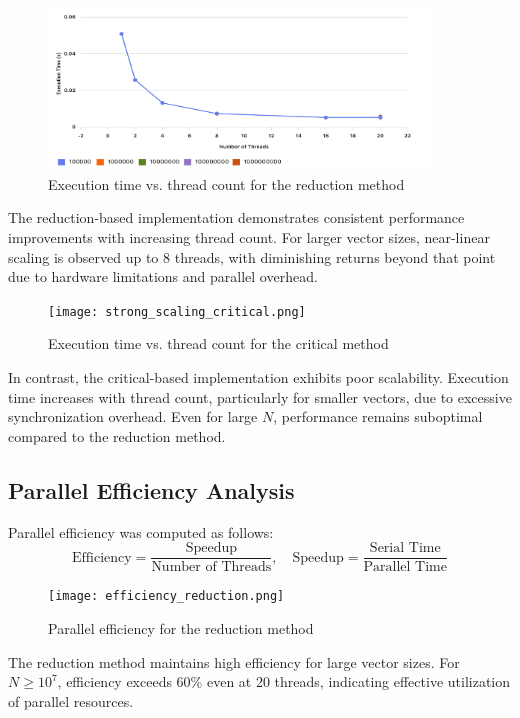 \documentclass[unicode,11pt,a4paper,oneside,numbers=endperiod,openany]{scrartcl}
\begin{document}
\begin{figure}[h]
  \centering
  \includegraphics[width=0.9\textwidth]{figures/Figure 1: Strong Scaling - Reduction Method.png}
  \caption{Execution time vs. thread count for the reduction method}
\end{figure}

The reduction-based implementation demonstrates consistent performance improvements with increasing thread count. For larger vector sizes, near-linear scaling is observed up to 8 threads, with diminishing returns beyond that point due to hardware limitations and parallel overhead.

\begin{figure}[h]
  \centering
  \texttt{[image: strong\_scaling\_critical.png]}
  \caption{Execution time vs. thread count for the critical method}
\end{figure}

In contrast, the critical-based implementation exhibits poor scalability. Execution time increases with thread count, particularly for smaller vectors, due to excessive synchronization overhead. Even for large $N$, performance remains suboptimal compared to the reduction method.

\subsection*{Parallel Efficiency Analysis}

Parallel efficiency was computed as follows:
\[
\text{Efficiency} = \frac{\text{Speedup}}{\text{Number of Threads}}, \quad \text{Speedup} = \frac{\text{Serial Time}}{\text{Parallel Time}}
\]

\begin{figure}[h]
  \centering
  \texttt{[image: efficiency\_reduction.png]}
  \caption{Parallel efficiency for the reduction method}
\end{figure}

The reduction method maintains high efficiency for large vector sizes. For $N \geq 10^7$, efficiency exceeds 60\% even at 20 threads, indicating effective utilization of parallel resources.
\end{document}
